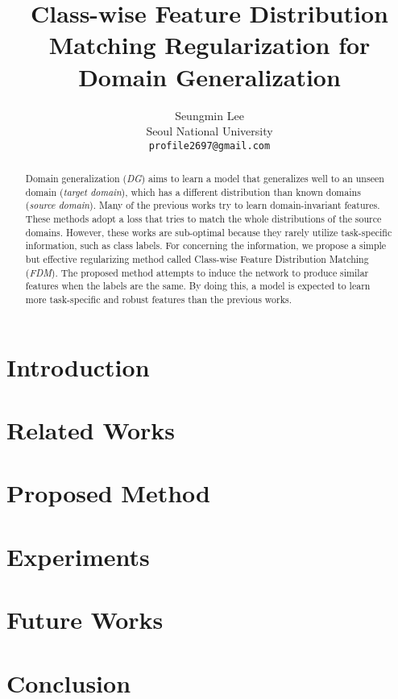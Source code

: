 \documentclass[10pt,twocolumn,letterpaper]{article}
\begin{document}
\title{Class-wise Feature Distribution Matching Regularization for Domain Generalization}

\author{Seungmin Lee\\
Seoul National University\\
{\tt\small profile2697@gmail.com}
}

\maketitle

\begin{abstract}
 Domain generalization (\textit{DG}) aims to learn a model that generalizes well to an unseen domain (\textit{target domain}), which has a different distribution than known domains (\textit{source domain}). Many of the previous works try to learn domain-invariant features. These methods adopt a loss that tries to match the whole distributions of the source domains. However, these works are sub-optimal because they rarely utilize task-specific information, such as class labels. For concerning the information, we propose a simple but effective regularizing method called Class-wise Feature Distribution Matching (\textit{FDM}). The proposed method attempts to induce the network to produce similar features when the labels are the same. By doing this, a model is expected to learn more task-specific and robust features than the previous works.
\end{abstract}

\section{Introduction}


\section{Related Works}


\section{Proposed Method}


\section{Experiments}


\section{Future Works}


\section{Conclusion}



{\small


}
\end{document}
